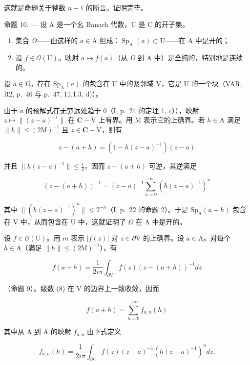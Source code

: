 这就是命题关于整数 \(n+1\) 的断言。证明完毕。

命题 10. --- 设 A 是一个幺 Banach 代数，U 是 C 的开子集。

\begin{enumerate}
\def\labelenumi{\alph{enumi})}
\tightlist
\item
  集合 \(\Omega\)——由这样的 \(a \in \mathrm{A}\) 组成：\(\operatorname{Sp}_{\mathrm{A}}(a) \subset \mathrm{U}\)——在 A 中是开的；
\item
  设 \(f \in \mathcal{O}(\mathrm{U})\)。映射 \(a \mapsto f(a)\)（从 \(\Omega\) 到 A 中）是全纯的，特别地是连续的。
\end{enumerate}

设 \(a \in \Omega\)。存在 \(\mathrm{Sp}_{\mathrm{A}}(a)\) 的包含在 U 中的紧邻域 V，它是 U 的一个块（VAR, R2, p.~46 与 p.~47, 11.1.3, d)）。

由于 \(a\) 的预解式在无穷远处趋于 0（I, p.~24 的定理 1, \(c\)）），映射 \(z \mapsto \| (z - a)^{-1}\|\) 在 \(\mathbf{C} - \mathring{\mathrm{V}}\) 上有界。用 M 表示它的上确界。若 \(h \in \mathrm{A}\) 满足 \(\| h\| \leqslant (2\mathrm{M})^{-1}\) 且 \(z \in \mathbf{C} - \mathring{\mathrm{V}}\)，则有

\[
z - (a + h) = (1 - h (z - a) ^ {- 1}) (z - a)
\]

并且 \(\|h(z-a)^{-1}\|\leqslant\frac{1}{2}\)，因而 \(z-(a+h)\) 可逆，其逆满足

\[
(z - (a + h)) ^ {- 1} = (z - a) ^ {- 1} \sum_ {n = 0} ^ {\infty} (h (z - a) ^ {- 1}) ^ {n}\tag{8}
\]

其中 \(\| (h(z - a)^{-1})^n\| \leqslant 2^{-n}\)（I, p.~22 的命题 2）。于是 \(\mathrm{Sp}_{\mathrm{A}}(a + h)\) 包含在 V 中，从而包含在 U 中，这就证明了 \(\Omega\) 在 A 中是开的。

设 \(f \in \mathcal{O}(\mathrm{U})\)。用 \(m\) 表示 \(|f(z)|\) 对 \(z \in \partial \mathrm{V}\) 的上确界。设 \(a \in \mathrm{A}\)。对每个 \(h \in \mathrm{A}\)（满足 \(\| h \| \leqslant (2\mathrm{M})^{-1}\)），有

\[
f (a + h) = \frac {1}{2 i \pi} \int_ {\partial \mathrm{V}} f (z) (z - (a + h)) ^ {- 1} d z
\]

（命题 9）。级数 (8) 在 V 的边界上一致收敛，因而

\[
f (a + h) = \sum_ {n = 0} ^ {+ \infty} f _ {a, n} (h)
\]

其中从 A 到 A 的映射 \(f_{a,n}\) 由下式定义

\[
f _ {a, n} (h) = \frac {1}{2 i \pi} \int_ {\partial \mathrm{V}} f (z) (z - a) ^ {- 1} (h (z - a) ^ {- 1}) ^ {n} d z.
\]

